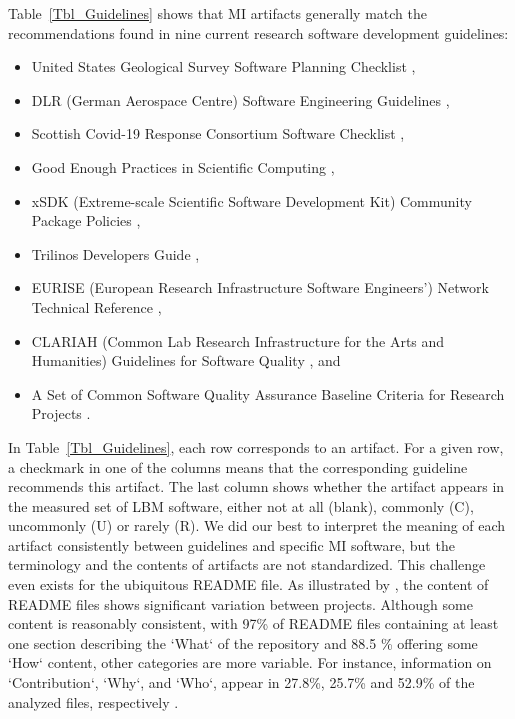 \documentclass[final, 3p, times, authoryear]{elsarticle}
\begin{document}
Table~\ref{Tbl_Guidelines} %
shows that MI artifacts generally match the recommendations found in nine
current research software development guidelines:
\begin{itemize}
\item United States Geological Survey Software Planning Checklist
\citep{USGS2019},
\item DLR (German Aerospace Centre) Software Engineering Guidelines
\citep{TobiasEtAl2018}, 
\item Scottish Covid-19 Response Consortium Software Checklist
\citep{BrettEtAl2021},
\item Good Enough Practices in Scientific Computing \citep{WilsonEtAl2016},
\item xSDK (Extreme-scale Scientific Software Development Kit) Community Package
Policies \citep{SmithAndRoscoe2018},
\item Trilinos Developers Guide \citep{HerouxEtAl2008},
\item EURISE (European Research Infrastructure Software Engineers') Network
Technical Reference \citep{ThielEtAl2020},
\item CLARIAH (Common Lab Research Infrastructure for the Arts and Humanities)
Guidelines for Software Quality \citep{vanGompelEtAl2016}, and
\item A Set of Common Software Quality Assurance Baseline Criteria for Research
Projects \citep{OrvizEtAl2017}.
\end{itemize}

In Table~\ref{Tbl_Guidelines}, each row corresponds to an artifact.  For a given
row, a checkmark in one of the columns means that the corresponding guideline
recommends this artifact.  The last column shows whether the artifact appears in
the measured set of LBM software, either not at all (blank), commonly (C),
uncommonly (U) or rarely (R).  We did our best to interpret the meaning of each
artifact consistently between guidelines and specific MI software, but the
terminology and the contents of artifacts are not standardized.  This challenge
even exists for the ubiquitous README file.  As illustrated by
\citet{PranaEtAl2018}, the content of README files shows significant variation
between projects.  Although some content is reasonably consistent, with 97\% of
README files containing at least one section describing the `What` of the
repository and 88.5 \% offering some `How` content, other categories are more
variable.  For instance, information on `Contribution`, `Why`, and `Who`,
appear in 27.8\%, 25.7\% and 52.9\% of the analyzed files, respectively
\citep{PranaEtAl2018}.  
\end{document}
